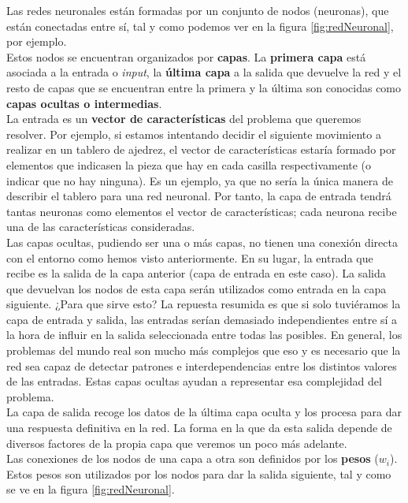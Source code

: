 \documentclass[11pt,fleqn]{book} %
\begin{document}
Las redes neuronales están formadas por un conjunto de nodos (neuronas), que están conectadas entre sí, tal y como podemos ver en la figura \ref{fig:redNeuronal}, por ejemplo. \\

Estos nodos se encuentran organizados por \textbf{capas}. La \textbf{primera capa} está asociada a la entrada o \textit{input}, la \textbf{última capa} a la salida que devuelve la red y el resto de capas que se encuentran entre la primera y la última son conocidas como \textbf{capas ocultas o intermedias}. \\

La entrada es un \textbf{vector de características} del problema que queremos resolver. Por ejemplo, si estamos intentando decidir el siguiente movimiento a realizar en un tablero de ajedrez, el vector de características estaría formado por elementos que indicasen la pieza que hay en cada casilla respectivamente (o indicar que no hay ninguna). Es un ejemplo, ya que no sería la única manera de describir el tablero para una red neuronal. Por tanto, la capa de entrada tendrá tantas neuronas como elementos el vector de características; cada neurona recibe una de las características consideradas. \\

Las capas ocultas, pudiendo ser una o más capas, no tienen una conexión directa con el entorno como hemos visto anteriormente. En su lugar, la entrada que recibe es la salida de la capa anterior (capa de entrada en este caso). La salida que devuelvan los nodos de esta capa serán utilizados como entrada en la capa siguiente. ¿Para que sirve esto? La repuesta resumida es que si solo tuviéramos la capa de entrada y salida, las entradas serían demasiado independientes entre sí a la hora de influir en la salida seleccionada entre todas las posibles. En general, los problemas del mundo real son mucho más complejos que eso y es necesario que la red sea capaz de detectar patrones e interdependencias entre los distintos valores de las entradas. Estas capas ocultas ayudan a representar esa complejidad del problema.\cite{article:redNeuronal2}\\

La capa de salida recoge los datos de la última capa oculta y los procesa para dar una respuesta definitiva en la red. La forma en la que da esta salida depende de diversos factores de la propia capa que veremos un poco más adelante. \\

Las conexiones de los nodos de una capa a otra son definidos por los \textbf{pesos} ($w_i$). Estos pesos son utilizados por los nodos para dar la salida siguiente, tal y como se ve en la figura \ref{fig:redNeuronal}.
\end{document}
